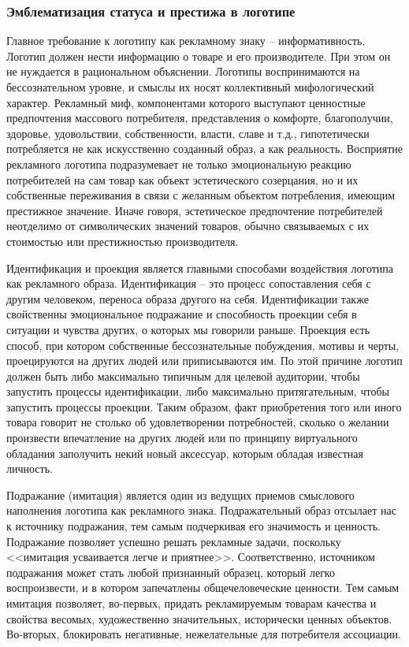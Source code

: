 \subsubsection{Эмблематизация статуса и престижа в логотипе}
Главное требование к логотипу как рекламному знаку -- информативность. Логотип
должен нести информацию о товаре и его производителе. При этом он не нуждается
в рациональном объяснении. Логотипы воспринимаются на бессознательном уровне,
и смыслы их носят коллективный мифологический характер. Рекламный миф,
компонентами которого выступают ценностные предпочтения массового потребителя,
представления о комфорте, благополучии, здоровье, удовольствии, собственности,
власти, славе и т.д., гипотетически потребляется не как искусственно созданный
образ, а как реальность. Восприятие рекламного логотипа подразумевает не только
эмоциональную реакцию потребителей на сам товар как объект эстетического
созерцания, но и их собственные переживания в связи с желанным объектом
потребления, имеющим престижное значение. Иначе говоря, эстетическое
предпочтение потребителей неотделимо от символических значений товаров, обычно
связываемых с их стоимостью или престижностью производителя.

Идентификация и проекция является главными способами воздействия логотипа как
рекламного образа. Идентификация -- это процесс сопоставления себя с другим
человеком, переноса образа другого на себя. Идентификации также свойственны
эмоциональное подражание и способность проекции себя в ситуации и чувства других,
о которых мы говорили раньше. Проекция есть способ, при котором собственные
бессознательные побуждения,  мотивы  и черты, проецируются на других людей
или приписываются им. По этой причине логотип должен быть либо максимально
типичным для целевой аудитории, чтобы запустить процессы идентификации, либо
максимально притягательным, чтобы запустить процессы проекции. Таким образом,
факт приобретения того или иного товара говорит не столько об удовлетворении
потребностей, сколько о желании произвести впечатление на других людей или по
принципу виртуального обладания заполучить некий новый аксессуар, которым обладая
известная личность.

Подражание (имитация) является один из ведущих приемов смыслового наполнения
логотипа как рекламного знака. Подражательный образ отсылает нас к источнику
подражания, тем самым подчеркивая его значимость и ценность. Подражание позволяет
успешно решать рекламные задачи, поскольку <<имитация усваивается легче и
приятнее>>.\autocite[][404]{lotman1998iskusstve} Соответственно, источником
подражания может стать любой признанный образец, который легко воспроизвести,
и в котором запечатлены общечеловеческие ценности. Тем самым имитация позволяет,
во-первых, придать рекламируемым товарам качества и свойства весомых,
художественно значительных, исторически ценных объектов. Во-вторых, блокировать
негативные, нежелательные для потребителя ассоциации.

